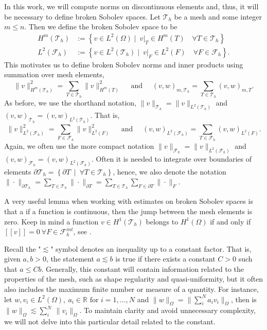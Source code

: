 \documentclass[11pt]{article}
\theoremstyle{remark}
\newcommand{\jump}[1]{\left[\!\left[ #1 \right]\!\right]}
\renewcommand{\le}{\leqslant}
\numberwithin{equation}{section}
\begin{document}
In this work, we will compute norms on discontinuous elements and, thus, it will be necessary to define broken Sobolev spaces.
Let $\mathcal{T}_{h} $ be a mesh and some integer $m\le n$. Then we define the broken Sobolev space to be \[
    \begin{split}
H^{m}( \mathcal{T}_{h} ) & := \left\{ v \in L^2( \Omega )  \mid \ v|_{T} \in H^{m}( T) \quad     \forall T \in  \mathcal{T}_{h} \right\}\\
        L^{2}( \mathcal{F}_{h} ) &:= \left\{ v \in L^2( \mathcal{T}_{h}  )  \mid   \ v|_{F} \in L^{2}( F)  \quad  \forall F \in  \mathcal{F}_{h}   \right\}.
    \end{split}
\]
This motivates us to define broken Sobolev norms and inner products using summation over mesh elements,
\[
 \| v \|_{H^{m}( \mathcal{T}_{h} ) }^{2} = \sum_{T \in  \mathcal{T}_{h} }^{} \| v  \|_{ H^{m}( T ) }^{2  } \quad \text{ and } \quad
 (v ,w )_{ m, \mathcal{T} _{h} }^{} = \sum_{T \in \mathcal{T} _{h}}^{} (v ,w )_{ m,T }^{  } .
\]
As before, we use the shorthand notation,  $\| v \|_{\mathcal{T}_{h}} =  \| v \|_{L^{2}( \mathcal{T}_{h} ) }$ and  $(v ,w )_{ \mathcal{T}_{h} }^{} = (v ,w )_{L^2( \mathcal{T}_{h} ) }^{} $.
That is,
\[
 \| v \|_{L^{2}( \mathcal{F}_{h} ) }^{2} = \sum_{F \in  \mathcal{F}_{h} }^{} \| v  \|_{ L^{2}( F ) }^{2  } \quad \text{ and } \quad
 (v ,w )_{L^{2}( \mathcal{F}_{h} ) }^{} = \sum_{T \in \mathcal{F} _{h}}^{} (v ,w )_{ L^{2}( F ) }^{  } .
\]
Again, we often use the more compact notation $\| v \|_{\mathcal{F}_{h}} =  \| v \|_{L^{2}( \mathcal{F}_{h} ) }$ and  $(v ,w )_{ \mathcal{F}_{h} }^{} = (v ,w )_{L^2( \mathcal{F}_{h} ) }^{} $.
Often  it is needed to integrate over boundaries of elements $\partial \mathcal{T} _{h}  = \left\{ \partial T \  \mid \  \forall T \in \mathcal{T}_{h} \right\}  $, hence, we also denote the notation $\| \cdot  \|_{ \partial \mathcal{T} _{h} }^{  } = \sum_{T \in \mathcal{T} _{h} }^{} \| \cdot  \|_{ \partial T }^{  }
=\sum_{T \in \mathcal{T} _{h} }^{} \sum_{F \in \partial T}^{}  \| \cdot  \|_{ F }^{  }  $.

A very useful lemma when working with estimates on broken Sobolev spaces is that a if a function is continuous, then the jump between the mesh elements is zero. Keep in mind a function $ v \in  H^{1}( \mathcal{T}_{h} ) $ belongs to $ H^{1}( \Omega )  $ if and only
if $ \jump{ v }   = 0 \  \forall F \in \mathcal{F}^{int}_{h}$, see \cite[Lemma 1.23]{pietro2012}.

Recall the "$\lesssim$" symbol denotes an inequality up to a constant factor. That is, given $a,b >0 $, the statement $a \lesssim b$ is true if there exists a constant $C>0$ such that $a \leq Cb$. Generally, this constant will contain
information related to the properties of the mesh, such as shape regularity and quasi-uniformity, but it often also includes the maximum finite number or measure of a quantity. For instance, let  $w , v_{i} \in L^{2}( \Omega ), \ a_{i} \in \mathbb{R}  \text{ for } i =
1,\ldots,N  $   and  $ \| w \|_{\Omega   }^{  }  =  \| \sum_{i}^{N} a_{i}  v_{i} \|_{\Omega   }^{  } $, then is $ \| w \|_{\Omega   }^{  }
\lesssim \sum_{i}^{N}  \  \| v_{i} \|_{\Omega   }^{  }  $. To maintain clarity and avoid unnecessary complexity, we will not delve into this particular detail related to the constant.
\end{document}
